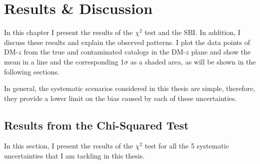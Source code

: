 \chapter{Results \& Discussion} \label{chap:results}
In this chapter I present the results of the $\chi^2$ test and the SBI. In addition, I discuss these results and explain the observed patterns. I plot the data points of DM-$z$ from the true and contaminated catalogs in the DM-$z$ plane and show the mean in a line and the corresponding 1$\sigma$ as a shaded area, as will be shown in the following sections.

In general, the systematic scenarios considered in this thesis are simple, therefore, they provide a lower limit on the bias caused by each of these uncertainties.


\section{Results from the Chi-Squared Test}
In this section, I present the results of the $\chi^2$ test for all the 5 systematic uncertainties that I am tackling in this thesis.

